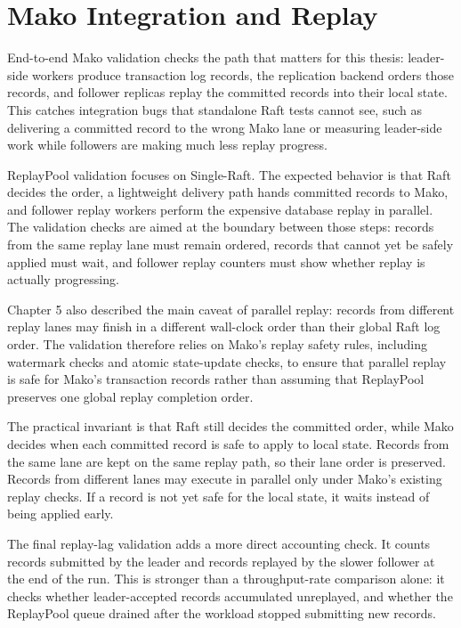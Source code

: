 \section{Mako Integration and Replay}

End-to-end Mako validation checks the path that matters for this thesis:
leader-side workers produce transaction log records, the replication backend
orders those records, and follower replicas replay the committed records into
their local state. This catches integration bugs that standalone Raft tests
cannot see, such as delivering a committed record to the wrong Mako lane or
measuring leader-side work while followers are making much less replay
progress.

ReplayPool validation focuses on Single-Raft. The expected behavior is that Raft
decides the order, a lightweight delivery path hands committed records to Mako,
and follower replay workers perform the expensive database replay in parallel.
The validation checks are aimed at the boundary between those steps: records
from the same replay lane must remain ordered, records that cannot yet be safely
applied must wait, and follower replay counters must show whether replay is
actually progressing.

Chapter 5 also described the main caveat of parallel replay: records from
different replay lanes may finish in a different wall-clock order than their
global Raft log order. The validation therefore relies on Mako's replay safety
rules, including watermark checks and atomic state-update checks, to ensure that
parallel replay is safe for Mako's transaction records rather than assuming that
ReplayPool preserves one global replay completion order.

The practical invariant is that Raft still decides the committed order, while
Mako decides when each committed record is safe to apply to local state. Records
from the same lane are kept on the same replay path, so their lane order is
preserved. Records from different lanes may execute in parallel only under
Mako's existing replay checks. If a record is not yet safe for the local state,
it waits instead of being applied early.

The final replay-lag validation adds a more direct accounting check. It counts
records submitted by the leader and records replayed by the slower follower at
the end of the run. This is stronger than a throughput-rate comparison alone:
it checks whether leader-accepted records accumulated unreplayed, and whether the
ReplayPool queue drained after the workload stopped submitting new records.

